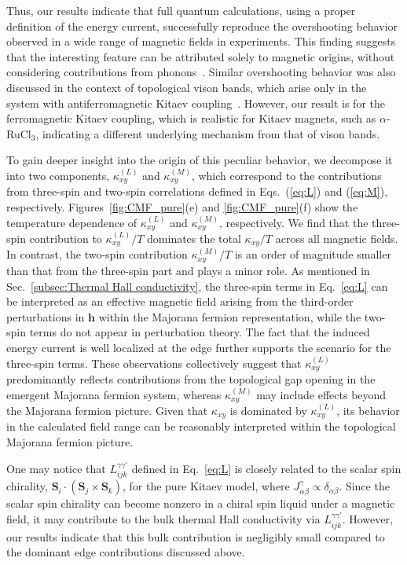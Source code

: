 \documentclass[twocolumn,superscriptaddress,showpacs, longbibliography, aps, prx]{revtex4-2}
\begin{document}
Thus, our results indicate that full quantum calculations, using a proper definition of the energy current, successfully reproduce the overshooting behavior observed in a wide range of magnetic fields in experiments. 
This finding suggests that the interesting feature can be %
attributed solely to magnetic origins, without considering contributions from phonons~\cite{Ye2018Quantization,Vinkler2018}. 
Similar overshooting behavior was also discussed in the context of topological vison bands, which arise only in the system with antiferromagnetic Kitaev coupling~\cite{Joy2022}. 
However, our result is for the ferromagnetic Kitaev coupling, which is realistic for Kitaev magnets, such as $\alpha$-RuCl$_3$, indicating a different underlying mechanism from that of vison bands. 

To gain deeper insight into the origin of this peculiar behavior, we decompose it into two components, $\kappa_{xy}^{(L)}$ and  $\kappa_{xy}^{(M)}$, which correspond to the contributions from three-spin and two-spin correlations defined in Eqs.~(\ref{eq:L}) and (\ref{eq:M}), respectively.
Figures~\ref{fig:CMF_pure}(e) and \ref{fig:CMF_pure}(f) show the temperature dependence of $\kappa_{xy}^{(L)}$ and  $\kappa_{xy}^{(M)}$, respectively.
We find that the three-spin contribution to $\kappa_{xy}^{(L)}/T$ dominates the total $\kappa_{xy}/T$ across all magnetic fields.
In contrast, the two-spin contribution $\kappa_{xy}^{(M)}/T$ is an order of magnitude smaller than that from the three-spin part and plays a minor role.
As mentioned in Sec.~\ref{subsec:Thermal Hall conductivity}, the three-spin terms in Eq.~\eqref{eq:L} can be interpreted as an effective magnetic field arising from the third-order perturbations in $\bm{h}$ within the Majorana fermion representation, while the two-spin terms do not appear in perturbation theory. 
The fact that the induced energy current is well localized at the edge further supports the scenario for the three-spin terms. 
These observations collectively suggest that $\kappa_{xy}^{(L)}$ predominantly reflects contributions from the topological gap opening in the emergent Majorana fermion system, whereas
$\kappa_{xy}^{(M)}$ may include effects beyond the Majorana fermion picture.
Given that $\kappa_{xy}$ is dominated by $\kappa_{xy}^{(L)}$, 
its behavior in the calculated field range can be reasonably interpreted within the topological Majorana fermion picture.

One may notice that $L_{ijk}^{\gamma\gamma'}$ defined in Eq.~\eqref{eq:L} is closely related to 
the scalar spin chirality, $\bm{S}_i\cdot (\bm{S}_j \times \bm{S}_k)$, for the pure Kitaev model, where $J^\gamma_{\alpha\beta} \propto \delta_{\alpha\beta}$. 
Since the scalar spin chirality can become nonzero in a chiral spin liquid under a magnetic field, it may contribute to the bulk thermal Hall conductivity via $L_{ijk}^{\gamma\gamma'}$.
However, our results indicate that this bulk contribution is negligibly small compared to the dominant edge contributions discussed above. 
\end{document}
